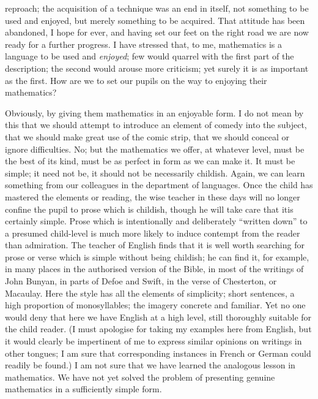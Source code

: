 reproach; the acquisition of a technique was an end in itself, not something to be used and enjoyed, but merely something to be acquired. That attitude has been abandoned, I hope for ever, and having set our feet on the right road we are now ready for a further progress. I have stressed that, to me, mathematics is a language to be used and {\em enjoyed}; few would quarrel with the first part of the description; the second would arouse more criticism; yet surely it is as important as the first. How are we to set our pupils on the way to enjoying their mathematics?

Obviously, by giving them mathematics in an enjoyable form. I do not mean by this that we should attempt to introduce an element of comedy into the subject, that we should make great use of the comic strip, that we should conceal or ignore difficulties. No; but the mathematics we offer, at whatever level, must be the best of its kind, must be as perfect in form as we can make it. It must be simple; it need not be, it should not be necessarily childish. Again, we can learn something from our colleagues in the department of languages. Once the child has mastered the elements or reading, the wise teacher in these days will no longer confine the pupil to prose which is childish, though he will take care that it\pageoriginale is certainly simple. Prose which is intentionally and deliberately ``written down'' to a presumed child-level is much more likely to induce contempt from the reader than admiration. The teacher of English finds that it is well worth searching for prose or verse which is simple without being childish; he can find it, for example, in many places in the authorised version of the Bible, in most of the writings of John Bunyan, in parts of Defoe and Swift, in the verse of Chesterton, or Macaulay. Here the style has all the elements of simplicity; short sentences, a high proportion of monosyllables; the imagery concrete and familiar. Yet no one would deny that here we have English at a high level, still thoroughly suitable for the child reader. (I must apologise for taking my examples here from English, but it would clearly be impertinent of me to express similar opinions on writings in other tongues; I am sure that corresponding instances in French or German could readily be found.) I am not sure that we have learned the analogous lesson in mathematics. We have not yet solved the problem of presenting genuine mathematics in a sufficiently simple form.

